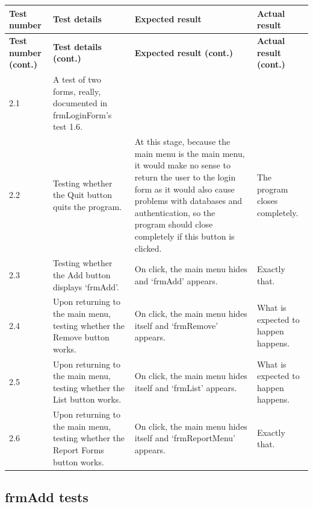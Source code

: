 \begin{longtable}{ | p{2cm} | p{4cm} | p{4cm} | p{4cm} | }
	\hline
	\textbf{Test number} & \textbf{Test details} & \textbf{Expected result} & \textbf{Actual result}\\
	\endfirsthead
	\hline
	\textbf{Test number (cont.)} & \textbf{Test details (cont.)} & \textbf{Expected result (cont.)} & \textbf{Actual result (cont.)}\\
	\endhead
	\hline
	2.1 & A test of two forms, really, documented in frmLoginForm's test 1.6. & &\\
	\hline
	2.2 & Testing whether the Quit button quits the program. & At this stage, because the main menu is the main menu, it would make no sense to return the user to the login form as it would also cause problems with databases and authentication, so the program should close completely if this button is clicked. & The program closes completely.\\
	\hline
	2.3 & Testing whether the Add button displays `frmAdd'. & On click, the main menu hides and `frmAdd' appears. & Exactly that.\\
	\hline
	2.4 & Upon returning to the main menu, testing whether the Remove button works. & On click, the main menu hides itself and `frmRemove' appears. & What is expected to happen happens.\\
	\hline
	2.5 & Upon returning to the main menu, testing whether the List button works. & On click, the main menu hides itself and `frmList' appears. & What is expected to happen happens.\\
	\hline
	2.6 & Upon returning to the main menu, testing whether the Report Forms button works. & On click, the main menu hides itself and `frmReportMenu' appears. & Exactly that.\\
	\hline
\end{longtable}

\subsection{frmAdd tests}

